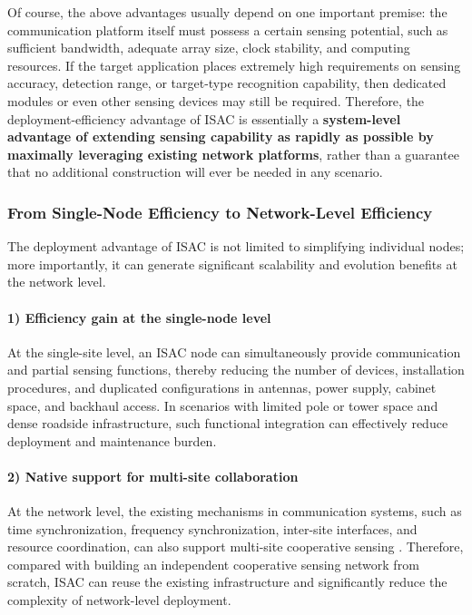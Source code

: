 Of course, the above advantages usually depend on one important premise: the communication platform itself must possess a certain sensing potential, such as sufficient bandwidth, adequate array size, clock stability, and computing resources. If the target application places extremely high requirements on sensing accuracy, detection range, or target-type recognition capability, then dedicated modules or even other sensing devices may still be required. Therefore, the deployment-efficiency advantage of ISAC is essentially a \textbf{system-level advantage of extending sensing capability as rapidly as possible by maximally leveraging existing network platforms}, rather than a guarantee that no additional construction will ever be needed in any scenario.

\subsubsection{From Single-Node Efficiency to Network-Level Efficiency}
\label{subsubsec:ch1-isac-core value-deployment-network}

The deployment advantage of ISAC is not limited to simplifying individual nodes; more importantly, it can generate significant scalability and evolution benefits at the network level.

\paragraph{1) Efficiency gain at the single-node level}
At the single-site level, an ISAC node can simultaneously provide communication and partial sensing functions, thereby reducing the number of devices, installation procedures, and duplicated configurations in antennas, power supply, cabinet space, and backhaul access. In scenarios with limited pole or tower space and dense roadside infrastructure, such functional integration can effectively reduce deployment and maintenance burden.

\paragraph{2) Native support for multi-site collaboration}
At the network level, the existing mechanisms in communication systems, such as time synchronization, frequency synchronization, inter-site interfaces, and resource coordination, can also support multi-site cooperative sensing \cite{Zhang2021ISAC6G,Liu2022ISAC}. Therefore, compared with building an independent cooperative sensing network from scratch, ISAC can reuse the existing infrastructure and significantly reduce the complexity of network-level deployment.

